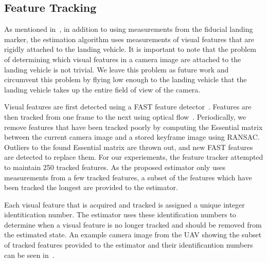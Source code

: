 
\subsection{Feature Tracking}
As mentioned in~, in addition to using measurements from the fiducial landing
marker, the estimation algorithm uses measurements of visual features that are
rigidly attached to the landing vehicle. It is important to note that the
problem of determining which visual features in a camera image are attached to
the landing vehicle is not trivial. We leave this problem as future work and
circumvent this problem by flying low enough to the landing vehicle that the
landing vehicle takes up the entire field of view of the camera.

Visual features are first detected using a FAST feature
detector~\cite{rosten2006machine}. Features are then tracked from one frame to
the next using optical flow~\cite{bouguet2001pyramidal}. Periodically, we remove
features that have been tracked poorly by computing the Essential matrix between
the current camera image and a stored keyframe image using RANSAC. Outliers to the found
Essential matrix are thrown out, and new FAST features are detected to replace
them. For our experiements, the feature tracker attempted to maintain 250
tracked features. As the proposed estimator only uses measurements from a few
tracked features, a subset of the features which have been tracked the longest
are provided to the estimator. 

Each visual feature that is acquired and tracked is assigned a unique integer
identitication number. The estimator uses these identification numbers to
determine when a visual feature is no longer tracked and should be removed from
the estimated state.
An example camera image from the UAV showing the
subset of tracked features provided to the estimator and their identificantion
numbers can be seen in~.


